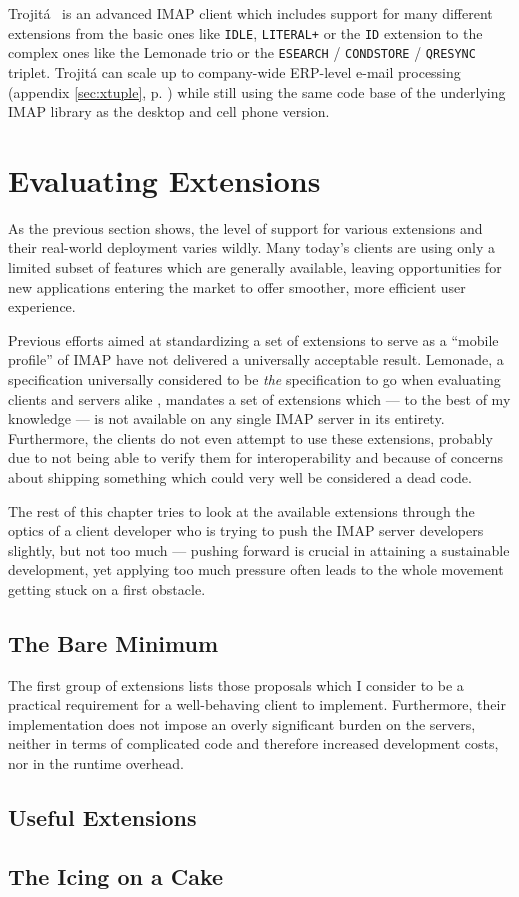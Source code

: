\documentclass[trojita]{subfiles}
\begin{document}
Trojitá~\cite{trojita-website} is an advanced IMAP client which includes support for many different extensions from the
basic ones like {\tt IDLE}, {\tt LITERAL+} or the {\tt ID} extension to the complex ones like the Lemonade trio or the
{\tt ESEARCH} / {\tt CONDSTORE} / {\tt QRESYNC} triplet.  Trojitá can scale up to company-wide ERP-level e-mail
processing (appendix \ref{sec:xtuple}, p. \pageref{sec:xtuple}) while still using the same code base of
the underlying IMAP library as the desktop and cell phone version.

\section{Evaluating Extensions}

As the previous section shows, the level of support for various extensions and their real-world deployment varies
wildly.  Many today's clients are using only a limited subset of features which are generally available, leaving
opportunities for new applications entering the market to offer smoother, more efficient user experience.

Previous efforts aimed at standardizing a set of extensions to serve as a ``mobile profile'' of IMAP have not delivered
a universally acceptable result.  Lemonade, a specification universally considered to be {\em the} specification to go
when evaluating clients and servers alike \cite{isode-lemonade}, mandates a set of extensions which --- to the best of
my knowledge --- is not available on any single IMAP server in its entirety.  Furthermore, the clients do not even
attempt to use these extensions, probably due to not being able to verify them for interoperability and because of
concerns about shipping something which could very well be considered a dead code.

The rest of this chapter tries to look at the available extensions through the optics of a client developer who is
trying to push the IMAP server developers slightly, but not too much --- pushing forward is crucial in attaining a
sustainable development, yet applying too much pressure often leads to the whole movement getting stuck on a first
obstacle.

\subsection{The Bare Minimum}

The first group of extensions lists those proposals which I consider to be a practical requirement for a well-behaving
client to implement.  Furthermore, their implementation does not impose an overly significant burden on the servers,
neither in terms of complicated code and therefore increased development costs, nor in the runtime overhead.


\subsection{Useful Extensions}


\subsection{The Icing on a Cake}

\end{document}
